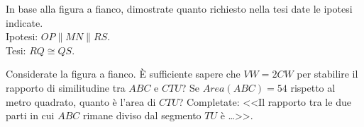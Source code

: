 \noindent\begin{minipage}{.5\textwidth}
\begin{esercizio}
\label{ese:6.90}
In base alla figura a fianco, dimostrate quanto richiesto 
nella tesi date le ipotesi indicate.\\
Ipotesi: \(OP\parallel MN\parallel RS\).\\
Tesi: \(RQ\cong QS\).
\end{esercizio}
\end{minipage}
\begin{minipage}{.5\textwidth}
\begin{inaccessibleblock}
 \begin{center}  \end{center}
\end{inaccessibleblock}
\end{minipage}

\noindent\begin{minipage}{.5\textwidth}
\begin{esercizio}
\label{ese:6.91}
Considerate la figura a fianco. È sufficiente sapere che 
\(VW=2CW\) per stabilire il rapporto di similitudine tra \(ABC\) e \(CTU\)? 
Se \(Area(ABC) = 54\) rispetto al metro quadrato, quanto è l'area di 
\(CTU\)? Completate: <<Il rapporto tra le due parti in cui \(ABC\) rimane 
diviso dal segmento \(TU\) è \ldots{}>>.
\end{esercizio}
\end{minipage}
\begin{minipage}{.5\textwidth}
\begin{inaccessibleblock}
 \begin{center}  \end{center}
\end{inaccessibleblock}
\end{minipage}

